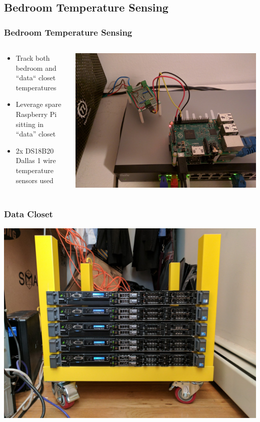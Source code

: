 \documentclass[aspectratio=169,11pt,hyperref={colorlinks=true}]{beamer}
\begin{document}
\subsection{Bedroom Temperature Sensing}
\begin{frame}
    \frametitle{Bedroom Temperature Sensing}
    \begin{columns}[T]
        \begin{column}{.48\textwidth}
            \begin{itemize}
                \item Track both bedroom and ``data`` closet temperatures
                \item Leverage spare Raspberry Pi sitting in ``data'' closet
                \item 2x DS18B20 Dallas 1 wire temperature sensors used
            \end{itemize}
        \end{column}
        \begin{column}{.48\textwidth}
            \centering
            \includegraphics[width=\textwidth]{raspi.jpg}
        \end{column}
    \end{columns}
\end{frame}

\begin{frame}
    \frametitle{Data Closet}
    \centering
    \includegraphics[width=.75\textwidth]{data_closet.jpg}
\end{frame}
\end{document}
